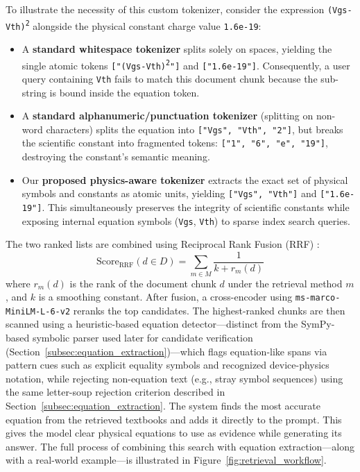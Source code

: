 \documentclass[a4paper,fleqn]{cas-sc}
\begin{document}
To illustrate the necessity of this custom tokenizer, consider the expression \texttt{(Vgs-Vth)\textsuperscript{2}} alongside the physical constant charge value \texttt{1.6e-19}:
\begin{itemize}
    \item A \textbf{standard whitespace tokenizer} splits solely on spaces, yielding the single atomic tokens \texttt{["(Vgs-Vth)\textsuperscript{2}"]} and \texttt{["1.6e-19"]}. Consequently, a user query containing \texttt{Vth} fails to match this document chunk because the sub-string is bound inside the equation token.
    \item A \textbf{standard alphanumeric/punctuation tokenizer} (splitting on non-word characters) splits the equation into \texttt{["Vgs", "Vth", "2"]}, but breaks the scientific constant into fragmented tokens: \texttt{["1", "6", "e", "19"]}, destroying the constant's semantic meaning.
    \item Our \textbf{proposed physics-aware tokenizer} extracts the exact set of physical symbols and constants as atomic units, yielding \texttt{["Vgs", "Vth"]} and \texttt{["1.6e-19"]}. This simultaneously preserves the integrity of scientific constants while exposing internal equation symbols (\texttt{Vgs}, \texttt{Vth}) to sparse index search queries.
\end{itemize}
The two ranked lists are combined using Reciprocal Rank Fusion (RRF) \citep{RRF-Cormack}:
\begin{equation*}
\mathrm{Score}_{\mathrm{RRF}}(d \in D) = \sum_{m \in M} \frac{1}{k + r_m(d)}
\end{equation*}
where $r_m(d)$ is the rank of the document chunk $d$ under the retrieval method $m$, and $k$ is a smoothing constant. After fusion, a cross-encoder using \texttt{ms-marco-MiniLM-L-6-v2} reranks the top candidates. The highest-ranked chunks are then scanned using a heuristic-based equation detector---distinct from the SymPy-based symbolic parser used later for candidate verification (Section~\ref{subsec:equation_extraction})---which flags equation-like spans via pattern cues such as explicit equality symbols and recognized device-physics notation, while rejecting non-equation text (e.g., stray symbol sequences) using the same letter-soup rejection criterion described in Section~\ref{subsec:equation_extraction}. The system finds the most accurate equation from the retrieved textbooks and adds it directly to the prompt. This gives the model clear physical equations to use as evidence while generating its answer. The full process of combining this search with equation extraction—along with a real-world example—is illustrated in Figure~\ref{fig:retrieval_workflow}.
\end{document}
